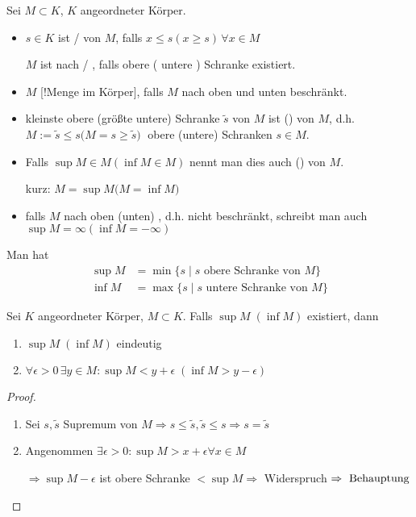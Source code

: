 \begin{*definition}
	Sei $M\subset K$, $K$ angeordneter Körper.
	\begin{itemize}
		\item $s\in K$ ist  /   von $M$, falls $x \le s (x \ge s)\,\forall x\in M$
		
		$M$ ist nach  /  , falls obere ( untere ) Schranke existiert.
		\item $M$ [!Menge im Körper], falls $M$ nach oben und unten beschränkt.
		\item kleinste obere (größte untere) Schranke $\tilde{s}$ von $M$ ist  () von $M$, d.h. \\
		$ M:= \tilde{s} \le s ($$ M = s \ge \tilde{s}) \;$ obere (untere) Schranken $s\in M$.
		\item Falls $\sup M \in M (\inf M\in M)$ nennt man dies auch  () von $M$.
		
		kurz: $M = \sup M ($$M = \inf M)$
		\item falls $M$ nach oben (unten) , d.h. nicht beschränkt, schreibt man auch $\sup M = \infty (\inf M = -\infty)$
	\end{itemize}

	Man hat
	\begin{align*}
	\sup M &= \min\{s \mid s \text{ obere Schranke von } M\}\\
	\inf M &= \max\{s \mid s \text{ untere Schranke von } M\}
	\end{align*}
\end{*definition}
\begin{proposition}
	Sei $K$ angeordneter Körper, $M\subset K$. Falls $\sup M\;(\inf M)$ existiert, dann
	\begin{enumerate}[label={\arabic*)}]
		\item $\sup M\;(\inf M)$ eindeutig
		\item $\forall \epsilon > 0\,\exists y\in M: \sup M < y + \epsilon\;(\inf M > y - \epsilon)$
	\end{enumerate}
\end{proposition}

\begin{proof}
	\begin{enumerate}[label={\arabic*)}]
		\item Sei $s,\tilde{s}$ Supremum von $M \Rightarrow s \le \tilde{s}, \tilde{s} \le s \Rightarrow s = \tilde{s}$
		\item Angenommen $\exists \epsilon > 0: \sup M > x + \epsilon \forall x \in M$

		$\Rightarrow \sup M-\epsilon $ ist obere Schranke $< \sup M \Rightarrow$ Widerspruch $\Rightarrow \text{ Behauptung}$
	\end{enumerate}
\end{proof}

